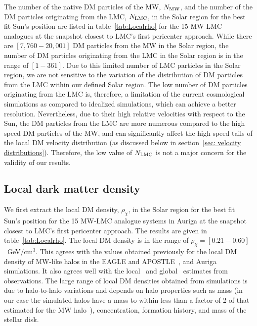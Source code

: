 The number of the native DM particles of the MW, $N_{\rm MW}$, and the number of the DM particles originating from the LMC, $N_{\rm LMC}$, in the Solar region for the best fit Sun's position are listed in table~\ref{tab:Localrho} for the 15 MW-LMC analogues at the snapshot closest to LMC's first pericenter approach. While there are $[7,760-20,001]$  DM particles from the MW in the Solar region, the number of DM particles originating from the LMC in the Solar region is in the range of $[1 - 361]$. Due to this limited number of LMC particles in the Solar region, we are not sensitive
to the variation of the distribution of DM particles from the LMC within our defined Solar region. The low number of DM particles originating from the LMC is, therefore, a limitation of the current cosmological simulations as compared to idealized simulations, which can achieve a better resolution. Nevertheless, due to their high relative velocities with respect to the Sun, the DM particles from the LMC are more numerous compared to the high speed DM particles of the MW, and can significantly affect the high speed tails of the local DM velocity distribution  (as discussed below in section~\ref{sec: velocity distributions}). Therefore, the low value of $N_{\rm LMC}$ is not a major concern for the validity of our results. 





\subsection{Local dark matter density}
\label{sec: DM density}


We first extract the local DM density, $\rho_\chi$, in the Solar region for the best fit Sun's position for the 15 MW-LMC analogue systems in Auriga at the snapshot closest to LMC's first pericenter approach. The results are given in table~\ref{tab:Localrho}. 
The local DM density is in the range of $\rho_\chi=[0.21-0.60]$~GeV/cm$^3$. This agrees  with the values obtained previously for the local DM density of MW-like halos in the EAGLE and APOSTLE~\cite{Bozorgnia:2016ogo}, and Auriga~\cite{Bozorgnia:2019mjk} simulations. It also agrees well with the local~\cite{Salucci:2010qr, Smith:2011fs, Bovy:2012tw, Garbari:2012ff, Zhang:2012rsb, Bovy:2013raa, 2018A&A...615A..99H, Buch:2018qdr} and global~\cite{McMillan:2011wd, Catena:2009mf, Weber:2009pt, Iocco:2011jz, Nesti:2013uwa, Sofue:2015xpa, Pato:2015dua, deSalas:2019pee} estimates from observations. The large range of local DM densities obtained from simulations is due to halo-to-halo variations and depends on halo properties such as mass (in our case the simulated halos have a mass to within less than a factor of 2 of that estimated for the MW halo~\cite{Callingham:2018vcf}), concentration, formation history, and mass of the stellar disk.

